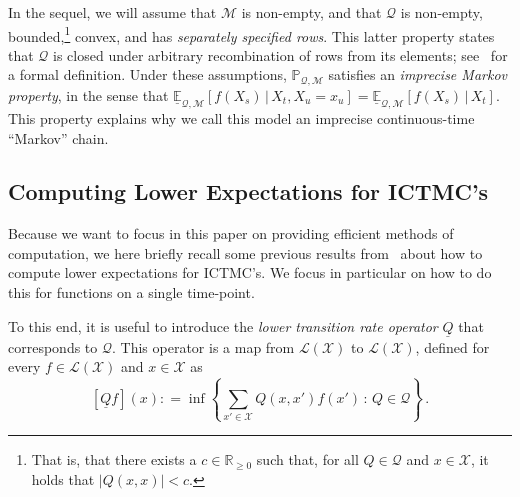 \documentclass[twoside,11pt]{article}
\newcommand{\reals}{\mathbb{R}}
\newcommand{\realsnonneg}{\reals_{\geq 0}}
\newcommand{\states}{\mathcal{X}}
\newcommand{\lexp}{\underline{\mathbb{E}}_{\rateset,\mathcal{M}}}
\newcommand{\gambles}{\mathcal{L}}
\newcommand{\gamblesX}{\gambles(\states)}
\newcommand{\rateset}{\mathcal{Q}}
\newcommand{\lrate}{\underline{Q}}
\newcommand{\abs}[1]{\left\vert #1 \right\vert}
\newcommand{\coloneqq}{:\!=}
\begin{document}
In the sequel, we will assume that $\mathcal{M}$ is non-empty, and that $\rateset$ is non-empty, bounded,\footnote{That is, that there exists a $c\in\realsnonneg$ such that, for all $Q\in\rateset$ and $x\in\states$, it holds that $\abs{Q(x,x)}<c$.} convex, and has \emph{separately specified rows}. This latter property states that $\rateset$ is closed under arbitrary recombination of rows from its elements; see~\citep[Definition 24]{krak2016ictmc} for a formal definition. %
Under these assumptions, $\mathbb{P}_{\rateset,\mathcal{M}}$ satisfies an \emph{imprecise Markov property}, in the sense that $\lexp[f(X_s)\,\vert\,X_t,X_u=x_u]=\lexp[f(X_s)\,\vert\,X_t]$. This property explains why we call this model an imprecise continuous-time ``Markov'' chain.

\subsection{Computing Lower Expectations for ICTMC's}\label{subsec:ICTMC_computations}

Because we want to focus in this paper on providing efficient methods of computation, we here briefly recall some previous results from~\citet{krak2016ictmc} about how to compute lower expectations for ICTMC's. We focus in particular on how to do this for functions on a single time-point. %

To this end, it is useful to introduce the \emph{lower transition rate operator} $\lrate$ that corresponds to $\rateset$. This operator is a map from $\gamblesX$ to $\gamblesX$, defined for every $f\in\gamblesX$ and  $x\in\states$ as
\begin{equation}\label{eq:lower_rate_is_inf}
\left[\lrate f\right](x) \coloneqq \inf\left\{ \sum_{x'\in\states}Q(x,x')f(x')\,:\, Q\in\rateset \right\}\,.
\end{equation}
\end{document}

